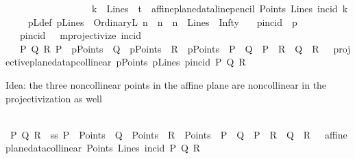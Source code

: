 \begin{isabellebody}
\ \ \ \ \ \ \ \ \ \ \ \ \ \ \ \ \ \ {\isacharparenleft}{\kern0pt}{\isacharparenleft}{\kern0pt}k\ {\isasymin}\ Lines{\isacharparenright}{\kern0pt}\ {\isasymand}\ {\isacharparenleft}{\kern0pt}t\ {\isacharequal}{\kern0pt}\ affine{\isacharunderscore}{\kern0pt}plane{\isacharunderscore}{\kern0pt}data{\isachardot}{\kern0pt}line{\isacharunderscore}{\kern0pt}pencil\ Points\ Lines\ {\isacharparenleft}{\kern0pt}incid{\isacharparenright}{\kern0pt}\ k{\isacharparenright}{\kern0pt}\ {\isacharparenright}{\kern0pt}{\isacharbraceright}{\kern0pt}{\isachardoublequoteclose}\isanewline
\ \ \ pLdef{\isacharcolon}{\kern0pt}\ {\isachardoublequoteopen}pLines\ {\isasymequiv}\ {\isacharbraceleft}{\kern0pt}OrdinaryL\ n\ {\isacharbar}{\kern0pt}\ n\ {\isachardot}{\kern0pt}\ {\isacharparenleft}{\kern0pt}n\ {\isasymin}\ Lines{\isacharparenright}{\kern0pt}{\isacharbraceright}{\kern0pt}\ {\isasymunion}\ {\isacharbraceleft}{\kern0pt}Infty{\isacharbraceright}{\kern0pt}{\isachardoublequoteclose}\isanewline
\ \ \ pincid\ {\isacharparenleft}{\kern0pt}\ {\isachardoublequoteopen}p{\isasymlhd}{\isachardoublequoteclose}\ {}{}{\isacharparenright}{\kern0pt}\isanewline
\ \ \ {\isacartoucheopen}pincid\ {\isacharequal}{\kern0pt}\ \ mprojectivize\ {\isacharparenleft}{\kern0pt}incid{\isacharparenright}{\kern0pt}{\isacartoucheclose}\isanewline
\ \ \isanewline
\ \ \ {\isachardoublequoteopen}{\isasymexists}P\ Q\ R{\isachardot}{\kern0pt}\ P\ {\isasymin}\ pPoints\ {\isasymand}\ Q\ {\isasymin}\ pPoints\ {\isasymand}\ R\ {\isasymin}\ pPoints\ {\isasymand}\ P\ {\isasymnoteq}\ Q\ {\isasymand}\ P\ {\isasymnoteq}\ R\ {\isasymand}\ Q\ {\isasymnoteq}\ R\ {\isasymand}\ {\isasymnot}\ {\isacharparenleft}{\kern0pt}projective{\isacharunderscore}{\kern0pt}plane{\isacharunderscore}{\kern0pt}data{}{\isachardot}{\kern0pt}pcollinear\ pPoints\ pLines\ {\isacharparenleft}{\kern0pt}pincid{\isacharparenright}{\kern0pt}\ P\ Q\ R{\isacharparenright}{\kern0pt}{\isachardoublequoteclose}%
\begin{isamarkuptext}%
Idea: the three noncollinear points in the affine plane are noncollinear in the projectivization as well%
\end{isamarkuptext}\isamarkuptrue%
%
\isadelimproof
%
\endisadelimproof
%
\isatagproof
{}\isamarkupfalse%
\ {\isacharminus}{\kern0pt}\isanewline
\ \ \isamarkupfalse%
\ P\ Q\ R\ \ ss{\isacharcolon}{\kern0pt}\ {\isachardoublequoteopen}P\ {\isasymin}\ Points\ {\isasymand}\ Q\ {\isasymin}\ Points\ {\isasymand}\ R\ {\isasymin}\ Points\ {\isasymand}\ P\ {\isasymnoteq}\ Q\ {\isasymand}\ P\ {\isasymnoteq}\ R\ {\isasymand}\ Q\ {\isasymnoteq}\ R\ {\isasymand}\ {\isasymnot}\ {\isacharparenleft}{\kern0pt}affine{\isacharunderscore}{\kern0pt}plane{\isacharunderscore}{\kern0pt}data{\isachardot}{\kern0pt}collinear\ Points\ Lines\ {\isacharparenleft}{\kern0pt}incid{\isacharparenright}{\kern0pt}\ P\ Q\ R{\isacharparenright}{\kern0pt}{\isachardoublequoteclose}\ \isanewline

\end{isabellebody}
